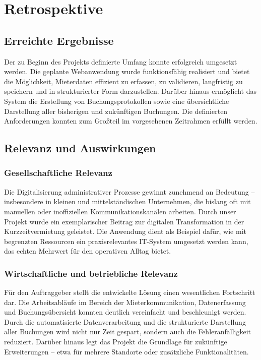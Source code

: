 \chapter{Retrospektive}

\section{Erreichte Ergebnisse}

Der zu Beginn des Projekts definierte Umfang konnte erfolgreich umgesetzt werden. Die geplante Webanwendung wurde funktionsfähig realisiert und bietet die Möglichkeit, Mieterdaten effizient zu erfassen, zu validieren, langfristig zu speichern und in strukturierter Form darzustellen. Darüber hinaus ermöglicht das System die Erstellung von Buchungsprotokollen sowie eine übersichtliche Darstellung aller bisherigen und zukünftigen Buchungen. Die definierten Anforderungen konnten zum Großteil im vorgesehenen Zeitrahmen erfüllt werden.

\section{Relevanz und Auswirkungen}

\subsection{Gesellschaftliche Relevanz}

Die Digitalisierung administrativer Prozesse gewinnt zunehmend an Bedeutung – insbesondere in kleinen und mittelständischen Unternehmen, die bislang oft mit manuellen oder inoffiziellen Kommunikationskanälen arbeiten. Durch unser Projekt wurde ein exemplarischer Beitrag zur digitalen Transformation in der Kurzzeitvermietung geleistet. Die Anwendung dient als Beispiel dafür, wie mit begrenzten Ressourcen ein praxisrelevantes IT-System umgesetzt werden kann, das echten Mehrwert für den operativen Alltag bietet.

\subsection{Wirtschaftliche und betriebliche Relevanz}

Für den Auftraggeber stellt die entwickelte Lösung einen wesentlichen Fortschritt dar. Die Arbeitsabläufe im Bereich der Mieterkommunikation, Datenerfassung und Buchungsübersicht konnten deutlich vereinfacht und beschleunigt werden. Durch die automatisierte Datenverarbeitung und die strukturierte Darstellung aller Buchungen wird nicht nur Zeit gespart, sondern auch die Fehleranfälligkeit reduziert. Darüber hinaus legt das Projekt die Grundlage für zukünftige Erweiterungen – etwa für mehrere Standorte oder zusätzliche Funktionalitäten.

